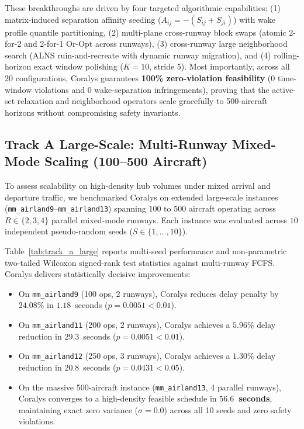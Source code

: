 \documentclass[10pt,journal,compsoc]{IEEEtran}
\begin{document}
These breakthroughs are driven by four targeted algorithmic capabilities: (1) matrix-induced separation affinity seeding ($A_{ij} = -(S_{ij} + S_{ji})$) with wake profile quantile partitioning, (2) multi-plane cross-runway block swaps (atomic 2-for-2 and 2-for-1 Or-Opt across runways), (3) cross-runway large neighborhood search (ALNS ruin-and-recreate with dynamic runway migration), and (4) rolling-horizon exact window polishing ($K=10$, stride 5). Most importantly, across all 20 configurations, Coralys guarantees \textbf{100\% zero-violation feasibility} ($0$ time-window violations and $0$ wake-separation infringements), proving that the active-set relaxation and neighborhood operators scale gracefully to 500-aircraft horizons without compromising safety invariants.

\subsection{Track A Large-Scale: Multi-Runway Mixed-Mode Scaling (100--500 Aircraft)}
To assess scalability on high-density hub volumes under mixed arrival and departure traffic, we benchmarked Coralys on extended large-scale instances (\texttt{mm\_airland9}--\texttt{mm\_airland13}) spanning $100$ to $500$ aircraft operating across $R \in \{2, 3, 4\}$ parallel mixed-mode runways. Each instance was evaluated across $10$ independent pseudo-random seeds ($S \in \{1, \dots, 10\}$).



Table~\ref{tab:track_a_large} reports multi-seed performance and non-parametric two-tailed Wilcoxon signed-rank test statistics against multi-runway FCFS. Coralys delivers statistically decisive improvements:
\begin{itemize}
    \item On \texttt{mm\_airland9} (100 ops, 2 runways), Coralys reduces delay penalty by \textbf{$24.08\%$} in $1.18$~seconds ($p = 0.0051 < 0.01$).
    \item On \texttt{mm\_airland11} (200 ops, 2 runways), Coralys achieves a \textbf{$5.96\%$} delay reduction in $29.3$~seconds ($p = 0.0051 < 0.01$).
    \item On \texttt{mm\_airland12} (250 ops, 3 runways), Coralys achieves a \textbf{$1.30\%$} delay reduction in $20.8$~seconds ($p = 0.0431 < 0.05$).
    \item On the massive 500-aircraft instance (\texttt{mm\_airland13}, 4 parallel runways), Coralys converges to a high-density feasible schedule in \textbf{$56.6$~seconds}, maintaining exact zero variance ($\sigma = 0.0$) across all 10 seeds and zero safety violations.
\end{itemize}
\end{document}
